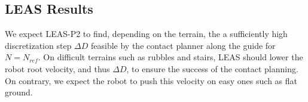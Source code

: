 \subsection{LEAS Results}
\label{subsub:mip:results}





We expect LEAS-P2 to find, depending on the terrain, the a sufficiently high discretization step $\Delta D$ feasible by the contact planner along the guide for $N=N_{ref}$.
On difficult terrains such as rubbles and stairs, LEAS should lower the robot root velocity, and thus $\Delta D$, to ensure the success of the contact planning. 
On contrary, we expect the robot to push this velocity on easy ones such as flat ground.



